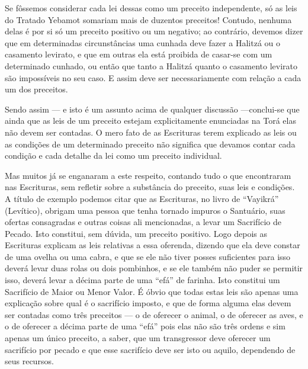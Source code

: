 Se fôssemos considerar cada lei dessas como um preceito independente,
só as leis do Tratado Yebamot somariam mais de duzentos preceitos!
Contudo, nenhuma delas é por si só um preceito positivo ou um negativo;
ao contrário, devemos dizer que em determinadas circunstâncias uma
cunhada deve fazer a Halitzá ou o casamento levirato, e que em
outras ela está proibida de casar-se com um determinado cunhado, ou
então que tanto a Halitzá quanto o casamento levirato são
impossíveis no seu caso. E assim deve ser necessariamente com relação a
cada um dos preceitos.

Sendo assim --- e isto é um assunto acima de qualquer discussão
---conclui-se que ainda que as leis de um preceito estejam
explicitamente enunciadas na Torá elas não devem ser contadas. O mero
fato de as Escrituras terem explicado as leis ou as condições de um
determinado preceito não significa que devamos contar cada condição e
cada detalhe da lei como um preceito individual.

Mas muitos já se enganaram a este respeito, contando tudo o que
encontraram nas Escrituras, sem refletir sobre a substância do preceito,
suas leis e condições. A título de exemplo podemos citar que as
Escrituras, no livro de ``Vayikrá'' (Levítico), obrigam uma pessoa que
tenha tornado impuros o Santuário, suas ofertas consagradas e outras
coisas ali mencionadas, a levar um Sacrifício de Pecado. Isto
constitui, sem dúvida, um preceito positivo. Logo depois as Escrituras
explicam as leis relativas a essa oferenda, dizendo que ela deve
constar de uma ovelha ou uma cabra, e que se ele não tiver posses
suficientes para isso deverá levar duas rolas ou dois pombinhos, e se
ele também não puder se permitir isso, deverá levar a décima parte de
uma ``efá'' de farinha. Isto constitui um Sacrifício de Maior ou Menor
Valor. É óbvio que todas estas leis são apenas uma explicação sobre qual
é o sacrifício imposto, e que de forma alguma elas devem ser contadas
como três preceitos --- o de oferecer o animal, o de oferecer as aves,
e o de oferecer a décima parte de uma ``efá'' pois elas não são três
ordens e sim apenas um único preceito, a saber, que um transgressor deve
oferecer um sacrifício por pecado e que esse sacrifício deve ser isto ou
aquilo, dependendo de seus recursos.

